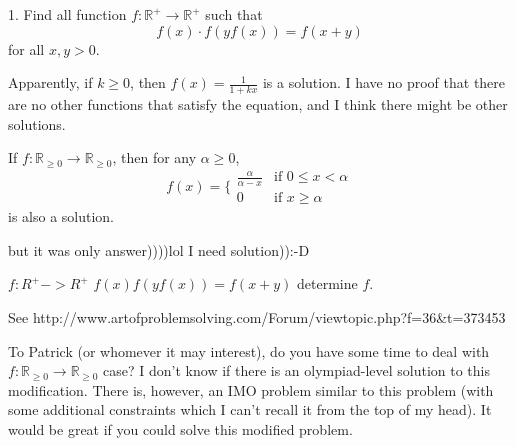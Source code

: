 \begin{solution}
	\begin{tcolorbox}1. Find all function $f: \mathbb R^{+} \to \mathbb R^{+}$ such that \[f(x) \cdot f(yf(x))=f(x+y)\]for all $x,y>0$.\end{tcolorbox}


Apparently, if $k \geq 0$, then $f(x) = \frac{1}{1+kx}$ is a solution.  I have no proof that there are no other functions that satisfy the equation, and I think there might be other solutions.

If $f:\mathbb{R}_{\geq 0} \to \mathbb{R}_{\geq 0}$, then for any $\alpha \geq 0$, \[f(x)=\{
\begin{array}{ll}
\frac{\alpha}{\alpha-x} & \text{if }0\leq x < \alpha
\\
0 & \text{if }x \geq \alpha\,
\end{array}\] is also a solution.
\end{solution}



\begin{solution}
	but it was only answer))))lol
I need solution)):-D
\end{solution}



\begin{solution}
	\begin{tcolorbox}$f:R^{+}->R^{+}$
$f(x)f(yf(x))=f(x+y)$
determine $f$.\end{tcolorbox}
See http://www.artofproblemsolving.com/Forum/viewtopic.php?f=36&t=373453
\end{solution}



\begin{solution}
	To Patrick (or whomever it may interest), do you have some time to deal with $f:\mathbb{R}_{\geq 0} \to \mathbb{R}_{\geq 0}$ case?  I don't know if there is an olympiad-level solution to this modification.  There is, however, an IMO problem similar to this problem (with some additional constraints which I can't recall it from the top of my head).  It would be great if you could solve this modified problem.
\end{solution}



